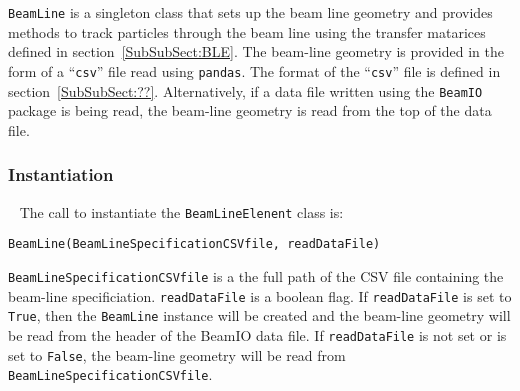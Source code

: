 \texttt{BeamLine} is a singleton class that sets up the beam line
geometry and provides methods to track particles through the beam line
using the transfer matarices defined in section~\ref{SubSubSect:BLE}.
The beam-line geometry is provided in the form of a ``\texttt{csv}''
file read using \texttt{pandas}.
The format of the ``\texttt{csv}'' file is defined in
section~\ref{SubSubSect:??}.
Alternatively, if a data file written using the \texttt{BeamIO}
package is being read, the beam-line geometry is read from the top of
the data file.

\subsubsection{Instantiation} ~\newline
\noindent
The call to instantiate the \texttt{BeamLineElenent} class is:
\begin{center}
  \texttt{BeamLine(BeamLineSpecificationCSVfile, readDataFile)}
\end{center}
\texttt{BeamLineSpecificationCSVfile} is a the full path of the CSV
file containing the beam-line specificiation.
\texttt{readDataFile} is a boolean flag.
If \texttt{readDataFile} is set to \texttt{True}, then the \texttt{BeamLine}
instance will be created and the beam-line geometry will be read from
the header of the BeamIO data file.
If \texttt{readDataFile} is not set or is set to \texttt{False}, the
beam-line geometry will be read
from \texttt{BeamLineSpecificationCSVfile}.

